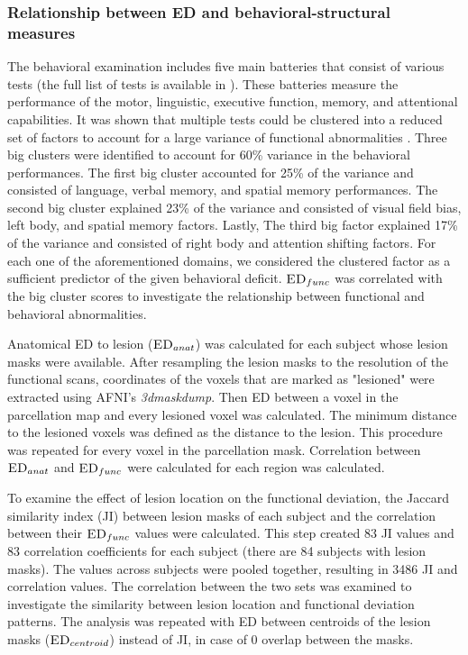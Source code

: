 \documentclass[fleqn,10pt]{wlscirep}
\begin{document}
\subsubsection*{Relationship between ED and behavioral-structural measures}

The behavioral examination includes five main batteries that consist of various tests (the full list of tests is available in \cite{corbetta2015common}). These batteries measure the performance of the motor, linguistic, executive function, memory, and attentional capabilities. It was shown that multiple tests could be clustered into a reduced set of factors to account for a large variance of functional abnormalities \citep{corbetta2015common}. Three big clusters were identified to account for 60\% variance in the behavioral performances. The first big cluster accounted for 25\% of the variance and consisted of language, verbal memory, and spatial memory performances. The second big cluster explained 23\% of the variance and consisted of visual field bias, left body, and spatial memory factors. Lastly, The third big factor explained 17\% of the variance and consisted of right body and attention shifting factors. For each one of the aforementioned domains, we considered the clustered factor as a sufficient predictor of the given behavioral deficit. $\textsc{ED}_{{func}}$ was correlated with the big cluster scores to investigate the relationship between functional and behavioral abnormalities.  

Anatomical ED to lesion ($\textsc{ED}_{{anat}}$) was calculated for each subject whose lesion masks were available. After resampling the lesion masks to the resolution of the functional scans, coordinates of the voxels that are marked as "lesioned" were extracted using AFNI's \emph{3dmaskdump}. Then ED between a voxel in the parcellation map and every lesioned voxel was calculated. The minimum distance to the lesioned voxels was defined as the distance to the lesion. This procedure was repeated for every voxel in the parcellation mask. Correlation between $\textsc{ED}_{{anat}}$ and $\textsc{ED}_{{func}}$ were calculated for each region was calculated.  %

To examine the effect of lesion location on the functional deviation, the Jaccard similarity index (JI) between lesion masks of each subject and the correlation between their $\textsc{ED}_{{func}}$ values were calculated. This step created 83 JI  values and 83 correlation coefficients for each subject (there are 84 subjects with lesion masks). The values across subjects were pooled together, resulting in 3486 JI and correlation values. The correlation between the two sets was examined to investigate the similarity between lesion location and functional deviation patterns. The analysis was repeated with ED between centroids of the lesion masks ($\textsc{ED}_{{centroid}}$) instead of JI, in case of 0 overlap between the masks.
\end{document}
